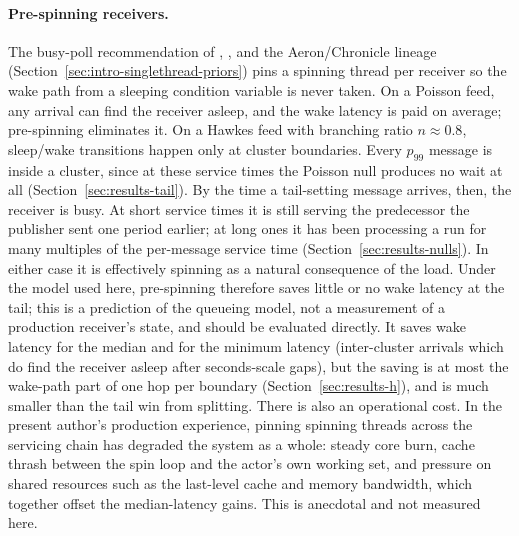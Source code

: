 \documentclass[11pt]{article}
\begin{document}
\paragraph{Pre-spinning receivers.} The busy-poll recommendation of
\citet{rigtorp_lowlatency}, \citet{belay2014ix}, and the Aeron/Chronicle lineage
(Section~\ref{sec:intro-singlethread-priors}) pins a spinning thread per receiver so the
wake path from a sleeping condition variable is never taken. On a Poisson feed, any
arrival can find the receiver asleep, and the wake latency is paid on average;
pre-spinning eliminates it. On a Hawkes feed with branching ratio $n \approx 0.8$,
sleep/wake transitions happen only at cluster boundaries. Every $p_{99}$ message is inside a cluster, since at these service times the Poisson
null produces no wait at all (Section~\ref{sec:results-tail}). By the time a tail-setting
message arrives, then, the receiver is busy. At short service times it is still serving
the predecessor the publisher sent one period earlier; at long ones it has been processing
a run for many multiples of the per-message service time
(Section~\ref{sec:results-nulls}). In either case it is effectively spinning
as a natural consequence of the load. Under the model used here, pre-spinning therefore saves little or
no wake latency at the tail; this is a prediction of the queueing model, not a measurement
of a production receiver's state, and should be evaluated directly. It saves wake latency
for the median and for the minimum latency (inter-cluster arrivals which do find the
receiver asleep after seconds-scale gaps), but the saving is at most the wake-path part of one hop per boundary (Section~\ref{sec:results-h}), and is much smaller than the tail win from splitting. There is also an operational cost. In the present author's production experience,
pinning spinning threads across the servicing chain has degraded the system as a whole:
steady core burn, cache thrash between the spin loop and the actor's own working set, and
pressure on shared resources such as the last-level cache and memory bandwidth, which
together offset the median-latency gains. This is anecdotal and not measured here.
\end{document}

